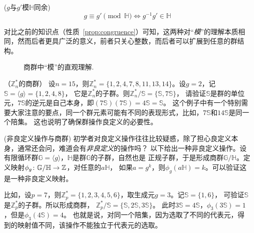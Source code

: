 \begin{property}{($g$与$g'$模$\mathbb{H}$同余)}
\label{prop:congruence_grp}
\[ g \equiv g' \pmod{\mathbb{H}} \iff g^{-1} g' \in \mathbb{H}\]
\end{property}

对比之前的知识点（性质~\ref{prop:congruence}）可知，这两种对“\emph{模}”的理解本质相同，然而后者更具广泛的意义，前者只关心整数，而后者可以扩展到任意的群结构。

\begin{figure}[htbp]
	\begin{center}
	\resizebox{0.4\linewidth}{!}{%
		
	}
	\caption{商群中“模”的直观理解.}
		\label{fig:mod_motivation}      
	\end{center}
\end{figure}

\begin{example}{（$\mathbb{Z}_n^*$的商群）}
\label{exm:quo_gr_Zn}
设$n = 15$，则$\mathbb{Z}_n^* = \{ 1, 2, 4, 7, 8, 11, 13, 14\}$。设$g = 2$，记$\mathbb{S} = \langle g \rangle = \{1, 2, 4, 8\}$，
它是$\mathbb{Z}_n^*$的子群。则$\mathbb{Z}_n^* / \mathbb{S} = \{ \mathbb{S}, 7\mathbb{S} \}$，
请验证$\mathbb{S}$是群的单位元，$7\mathbb{S} $的逆元是自己本身，即$(7\mathbb{S}) (7\mathbb{S})  = 4 \mathbb{S}= \mathbb{S}$。
这个例子中有一个特别需要大家注意的要点，同一个群元素可能有不同的表现形式，比如，$7\mathbb{S}$和$14 \mathbb{S}$是同一个陪集。
这也说明了确保群操作良定义的必要性。
\end{example}

\begin{example}{(非良定义操作与商群)}
初学者对良定义操作往往比较疑惑，除了担心良定义本身，通常还会问，难道会有\emph{非良定义}的操作吗？
以下给出一种非良定义操作。设有限循环群$\mathbb{G}=\langle g \rangle$，$\mathbb{H}$是群$\mathbb{G}$的子群，自然也是
正规子群，于是形成商群$\mathbb{G}/\mathbb{H}$。定义映射$\phi_g\colon \mathbb{G}/\mathbb{H} \to {\mathbb Z} $，对任意的$a\mathbb{H}$，
如果$a = g^k$，则$\phi_g(a\mathbb{H}) = k$。可以验证这是一种非良定义映射。

比如，设$p = 7$，则$\mathbb{Z}_p^* = \{ 1, 2, 3, 4, 5, 6\}$，取生成元$g = 3$。记$\mathbb{S} = \{1, 6\}$，
可验证$\mathbb{S}$是$\mathbb{Z}_p^*$的子群。所以形成商群，
$\mathbb{Z}_p^* / \mathbb{S} = \{ \mathbb{S}, 2\mathbb{S}, 3\mathbb{S} \}$。
此时$3\mathbb{S}= 4 \mathbb{S}$，$\phi_3 ( 3 \mathbb{S}) = 1$，但是$\phi_3 (4\mathbb{S}) = 4$。
也就是说，对同一个陪集，因为选取了不同的代表元，得到的映射值不同，该操作不能独立于代表元的选取。
\end{example}

